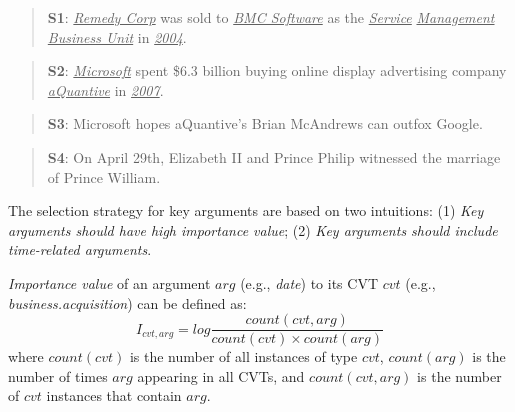 \begin{quote}
	\textbf{S1}: \underline{\emph{Remedy Corp}} was sold to \underline{\emph{BMC Software}} as the \underline{\emph{Service}} \underline{\emph{Management Business Unit}} in \underline{\emph{2004}}.
\end{quote}
\begin{quote}
\textbf{S2}: \underline{\emph{Microsoft}} spent \$6.3 billion buying online display advertising company \underline{\emph{aQuantive}} in \underline{\emph{2007}}.
\end{quote}
\begin{quote}
\textbf{S3}: Microsoft hopes aQuantive's Brian McAndrews can outfox Google.
\end{quote}
\begin{quote}
\textbf{S4}: On April 29th, Elizabeth II and Prince Philip witnessed the marriage of Prince William.
\end{quote}

The selection strategy for key arguments are based on two intuitions: (1) \emph{Key arguments should have high importance value}; (2) \emph{Key arguments should include time-related arguments}.



\emph{Importance value} of an argument $arg$ (e.g., \emph{date}) to its CVT $cvt$ (e.g., \emph{business.acquisition}) can be defined as:
\begin{equation}
	I_{cvt, arg} = log \frac{count(cvt, arg)}{count(cvt) \times count(arg)} 
\end{equation}
where $count(cvt)$ is the number of all instances of type $cvt$, $count(arg)$ is the number of times $arg$ appearing in all CVTs, and $count(cvt, arg)$ is the number of $cvt$ instances that contain $arg$. 

